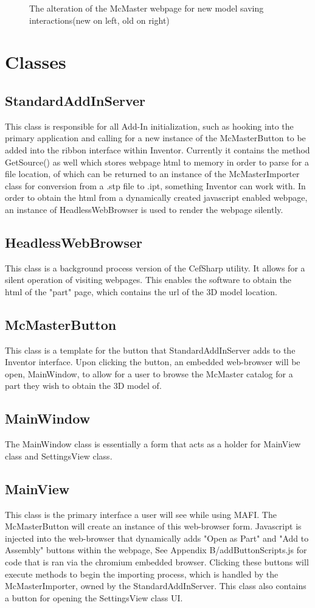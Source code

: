 \documentclass[12pt, letterpaper]{article}
\begin{document}
\begin{figure}[H]
\begin{minipage}{0.2\textwidth}
    \end{minipage}
    \caption{The alteration of the McMaster webpage for new model saving interactions(new on left, old on right)}
\end{figure}
\newpage
\section{Classes}
\subsection{StandardAddInServer}
This class is responsible for all Add-In initialization, such as hooking into the primary application 
and calling for a new instance of the McMasterButton to be added into
the ribbon interface within Inventor. Currently it contains the method GetSource() as well which 
stores webpage html to memory in order to parse for a file location, of which can be returned to an instance of 
the McMasterImporter class for conversion from a .stp file to .ipt, something Inventor can work with. In 
order to obtain the html from a dynamically created javascript enabled webpage, an instance of HeadlessWebBrowser is
used to render the webpage silently.
\subsection{HeadlessWebBrowser}
This class is a background process version of the CefSharp utility. It allows for a silent operation of visiting 
webpages. This enables the software to obtain the html of the "part" page, which contains the url of the 3D model 
location.
\subsection{McMasterButton}
This class is a template for the button that StandardAddInServer adds to the Inventor interface. Upon 
clicking the button, an embedded web-browser will be open, MainWindow, to allow for a user to browse 
the McMaster catalog for a part they wish to obtain the 3D model of.
\subsection{MainWindow}
The MainWindow class is essentially a form that acts as a holder for MainView class and SettingsView class.
\subsection{MainView}
This class is the primary interface a user will see while using MAFI. The McMasterButton will create an 
instance of this web-browser form. Javascript is injected into the web-browser that dynamically adds "Open 
as Part" and "Add to Assembly" buttons within the webpage, See Appendix B/addButtonScripts.js for code that is ran via the chromium embedded browser. 
Clicking these buttons will execute methods to begin 
the importing process, which is handled by the McMasterImporter, owned by the StandardAddInServer. This class also contains a button 
for opening the SettingsView class UI.
\end{document}

